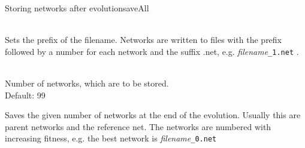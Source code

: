 

\begin{moduledoc}{Storing networks after evolution}{saveAll}
  
\item[\KeyWord{netDestName} \Param{filename}]~\\
Sets the prefix of the filename. Networks are written to files with the
prefix followed by a number for each network and the suffix .net, e.g. {\it filename}\verb+_1.net+ .\\

\item[\KeyWord{saveNetsCnt} \optParam{cnt}]~\\
 Number of networks, which are to be stored.\\
  Default: 99
  
\end{moduledoc}

Saves the given number of  networks  at the end of the evolution. Usually this are
parent networks and the reference net. The networks are numbered with increasing
fitness, e.g. the best network is {\it filename}\verb+_0.net+

